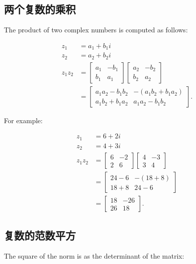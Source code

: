 \subsection{两个复数的乘积}
The product of two complex numbers is computed as follows:

$$
\begin{aligned}
z_{1} & =a_{1}+b_{1} i \\
z_{2} & =a_{2}+b_{2} i \\
z_{1} z_{2} & =\left[\begin{array}{cc}
a_{1} & -b_{1} \\
b_{1} & a_{1}
\end{array}\right]\left[\begin{array}{cc}
a_{2} & -b_{2} \\
b_{2} & a_{2}
\end{array}\right] \\
& =\left[\begin{array}{cc}
a_{1} a_{2}-b_{1} b_{2} & -\left(a_{1} b_{2}+b_{1} a_{2}\right) \\
a_{1} b_{2}+b_{1} a_{2} & a_{1} a_{2}-b_{1} b_{2}
\end{array}\right] .
\end{aligned}
$$

For example:

$$
\begin{aligned}
z_{1} & =6+2 i \\
z_{2} & =4+3 i \\
z_{1} z_{2} & =\left[\begin{array}{cc}
6 & -2 \\
2 & 6
\end{array}\right]\left[\begin{array}{cc}
4 & -3 \\
3 & 4
\end{array}\right] \\
& =\left[\begin{array}{cc}
24-6 & -(18+8) \\
18+8 & 24-6
\end{array}\right] \\
& =\left[\begin{array}{cc}
18 & -26 \\
26 & 18
\end{array}\right] .
\end{aligned}
$$

\subsection{复数的范数平方}
The square of the norm is as the determinant of the matrix:


